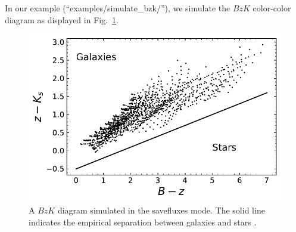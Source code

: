 In our example (``examples/simulate\_bzk/''), we simulate the $BzK$ color-color diagram \citep{daddi04} as displayed in Fig.~\ref{fig:bzk}.

\begin{figure}[ht]
\centering
\includegraphics[width=\columnwidth]{savefluxes/bzk.pdf}
\caption[A $BzK$ diagram simulated in the savefluxes mode]{A $BzK$ diagram simulated in the savefluxes mode. 
The solid line indicates the empirical separation between galaxies and stars \citep{daddi04}.}
\label{fig:bzk}
\end{figure}
